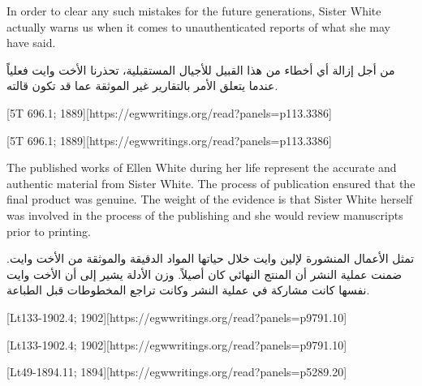 In order to clear any such mistakes for the future generations, Sister White actually warns us when it comes to unauthenticated reports of what she may have said.


من أجل إزالة أي أخطاء من هذا القبيل للأجيال المستقبلية، تحذرنا الأخت وايت فعلياً عندما يتعلق الأمر بالتقارير غير الموثقة عما قد تكون قالته.


[5T 696.1; 1889][https://egwwritings.org/read?panels=p113.3386]


[5T 696.1; 1889][https://egwwritings.org/read?panels=p113.3386]


The published works of Ellen White during her life represent the accurate and authentic material from Sister White. The process of publication ensured that the final product was genuine. The weight of the evidence is that Sister White herself was involved in the process of the publishing and she would review manuscripts prior to printing.


تمثل الأعمال المنشورة لإلين وايت خلال حياتها المواد الدقيقة والموثقة من الأخت وايت. ضمنت عملية النشر أن المنتج النهائي كان أصيلاً. وزن الأدلة يشير إلى أن الأخت وايت نفسها كانت مشاركة في عملية النشر وكانت تراجع المخطوطات قبل الطباعة.


[Lt133-1902.4; 1902][https://egwwritings.org/read?panels=p9791.10]


[Lt133-1902.4; 1902][https://egwwritings.org/read?panels=p9791.10]


[Lt49-1894.11; 1894][https://egwwritings.org/read?panels=p5289.20]


